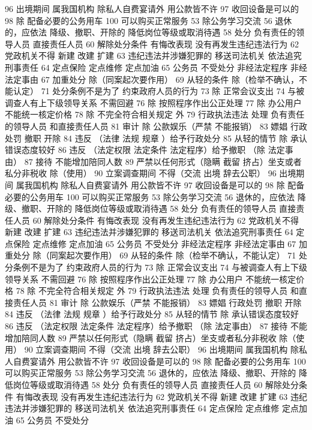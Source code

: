 \documentclass[cyan]{elegantnote}
\begin{document}
96 出境期间 属我国机构 除私人自费宴请外 用公款皆不许
97 收回设备是可以的
98 除 配备必要的公务用车
100 可以购买正常服务
53 除公务学习交流
56 退休的，应依法
降级、撤职、开除的 降低岗位等级或取消待遇
58 处分
负有责任的领导人员
直接责任人员
60 解除处分条件
有悔改表现
没有再发生违纪违法行为
62 党政机关不得
新建 改建 扩建
63 违纪违法并涉嫌犯罪的
移送司法机关
依法追究刑事责任
64 定点保险 定点维修 定点加油
65 公务员 不受处分
非经法定程序
非经法定事由
67 加重处分
除（同案起次要作用）
69 从轻的条件
除（检举不确认，不能认定）
71 处分条例不是为了
约束政府人员的行为
73 除 正常会议支出
74 与被调查人有上下级领导关系 不需回避
76 除 按照程序作出公正处理
77 除 办公用户
不能统一核定价格
78 除 不完全符合相关规定 外
79 行政执法违法 处理
负有责任的领导人员
和直接责任人员
81 审计
除 公款娱乐（严禁 不能报销）
83 嫖娼 行政处罚
撤职 开除
84 违反 （法律 法规 规章 ）给予行政处分
85 从轻的情节
除 承认错误态度较好
86 违反 （法定权限 法定条件 法定程序）给予撤职
（除 法定事由）
87 接待 不能增加陪同人数
89 严禁以任何形式（隐瞒 截留 挤占）坐支或者私分非税收
除（使用）
90 立案调查期间 不得（交流 出境 辞去公职）
96 出境期间 属我国机构 除私人自费宴请外 用公款皆不许
97 收回设备是可以的
98 除 配备必要的公务用车
100 可以购买正常服务
53 除公务学习交流
56 退休的，应依法
降级、撤职、开除的 降低岗位等级或取消待遇
58 处分
负有责任的领导人员
直接责任人员
60 解除处分条件
有悔改表现
没有再发生违纪违法行为
62 党政机关不得
新建 改建 扩建
63 违纪违法并涉嫌犯罪的
移送司法机关
依法追究刑事责任
64 定点保险 定点维修 定点加油
65 公务员 不受处分
非经法定程序
非经法定事由
67 加重处分
除（同案起次要作用）
69 从轻的条件
除（检举不确认，不能认定）
71 处分条例不是为了
约束政府人员的行为
73 除 正常会议支出
74 与被调查人有上下级领导关系 不需回避
76 除 按照程序作出公正处理
77 除 办公用户
不能统一核定价格
78 除 不完全符合相关规定 外
79 行政执法违法 处理
负有责任的领导人员
和直接责任人员
81 审计
除 公款娱乐（严禁 不能报销）
83 嫖娼 行政处罚
撤职 开除
84 违反 （法律 法规 规章 ）给予行政处分
85 从轻的情节
除 承认错误态度较好
86 违反 （法定权限 法定条件 法定程序）给予撤职
（除 法定事由）
87 接待 不能增加陪同人数
89 严禁以任何形式（隐瞒 截留 挤占）坐支或者私分非税收
除（使用）
90 立案调查期间 不得（交流 出境 辞去公职）
96 出境期间 属我国机构 除私人自费宴请外 用公款皆不许
97 收回设备是可以的
98 除 配备必要的公务用车
100 可以购买正常服务
53 除公务学习交流
56 退休的，应依法
降级、撤职、开除的 降低岗位等级或取消待遇
58 处分
负有责任的领导人员
直接责任人员
60 解除处分条件
有悔改表现
没有再发生违纪违法行为
62 党政机关不得
新建 改建 扩建
63 违纪违法并涉嫌犯罪的
移送司法机关
依法追究刑事责任
64 定点保险 定点维修 定点加油
65 公务员 不受处分
\end{document}
